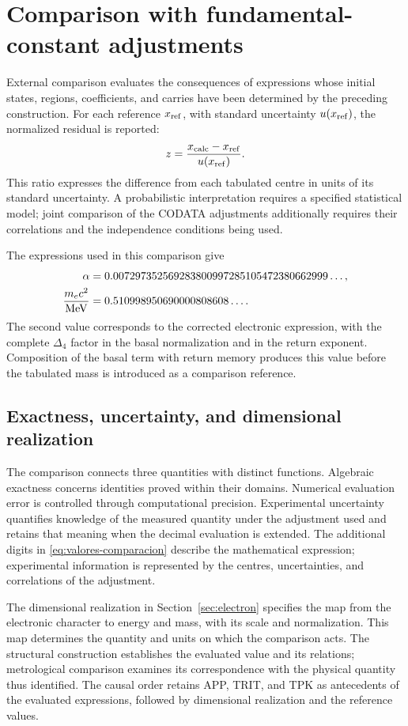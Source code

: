 \section{Comparison with fundamental-constant adjustments}
\label{sec:comparacion}

External comparison evaluates the consequences of expressions whose initial states, regions, coefficients, and carries have been determined by the preceding construction. For each reference \(x_{\rm ref}\), with standard uncertainty \(u(x_{\rm ref})\), the normalized residual is reported:
\[
 z=\frac{x_{\rm calc}-x_{\rm ref}}{u(x_{\rm ref})}.
\]
This ratio expresses the difference from each tabulated centre in units of its standard uncertainty. A probabilistic interpretation requires a specified statistical model; joint comparison of the CODATA adjustments additionally requires their correlations and the independence conditions being used.

The expressions used in this comparison give
\begin{align}
 \alpha&=0.007297352569283800997285105472380662999\ldots,\notag\\
 \frac{m_ec^2}{\mathrm{MeV}}&=0.510998950690000808608\ldots.
 \label{eq:valores-comparacion}
\end{align}
The second value corresponds to the corrected electronic expression, with the complete \(\Delta_4\) factor in the basal normalization and in the return exponent. Composition of the basal term with return memory produces this value before the tabulated mass is introduced as a comparison reference.

\subsection{Exactness, uncertainty, and dimensional realization}

The comparison connects three quantities with distinct functions. Algebraic exactness concerns identities proved within their domains. Numerical evaluation error is controlled through computational precision. Experimental uncertainty quantifies knowledge of the measured quantity under the adjustment used and retains that meaning when the decimal evaluation is extended. The additional digits in \eqref{eq:valores-comparacion} describe the mathematical expression; experimental information is represented by the centres, uncertainties, and correlations of the adjustment.

The dimensional realization in Section~\ref{sec:electron} specifies the map from the electronic character to energy and mass, with its scale and normalization. This map determines the quantity and units on which the comparison acts. The structural construction establishes the evaluated value and its relations; metrological comparison examines its correspondence with the physical quantity thus identified. The causal order retains APP, TRIT, and TPK as antecedents of the evaluated expressions, followed by dimensional realization and the reference values.

